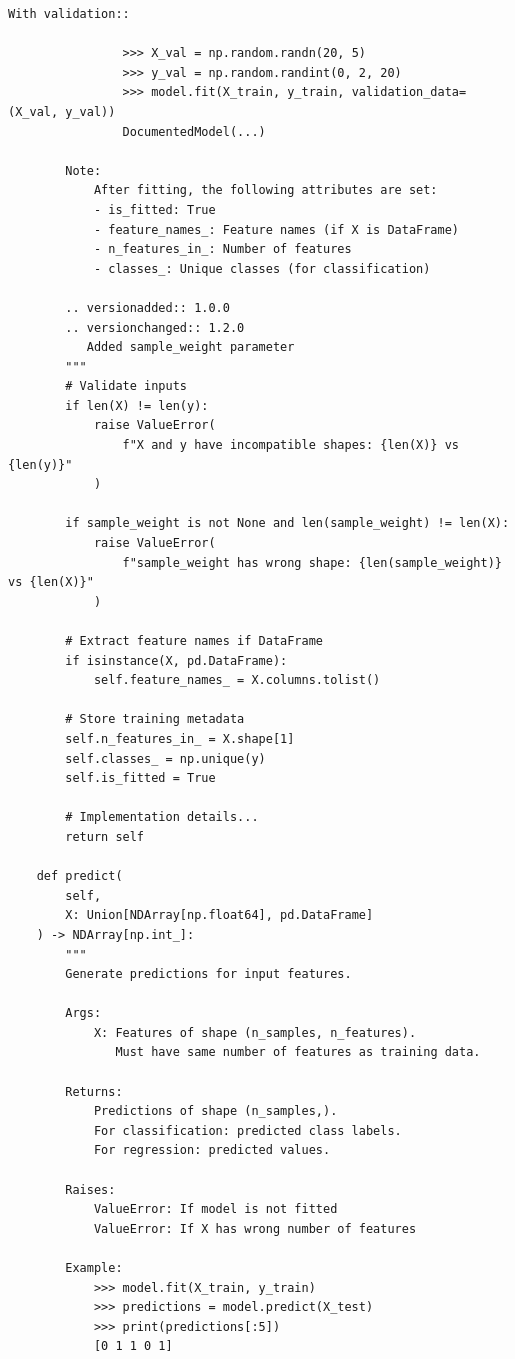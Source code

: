 \begin{lstlisting}[style=python, caption=Comprehensive docstring examples]
            With validation::

                >>> X_val = np.random.randn(20, 5)
                >>> y_val = np.random.randint(0, 2, 20)
                >>> model.fit(X_train, y_train, validation_data=(X_val, y_val))
                DocumentedModel(...)

        Note:
            After fitting, the following attributes are set:
            - is_fitted: True
            - feature_names_: Feature names (if X is DataFrame)
            - n_features_in_: Number of features
            - classes_: Unique classes (for classification)

        .. versionadded:: 1.0.0
        .. versionchanged:: 1.2.0
           Added sample_weight parameter
        """
        # Validate inputs
        if len(X) != len(y):
            raise ValueError(
                f"X and y have incompatible shapes: {len(X)} vs {len(y)}"
            )

        if sample_weight is not None and len(sample_weight) != len(X):
            raise ValueError(
                f"sample_weight has wrong shape: {len(sample_weight)} vs {len(X)}"
            )

        # Extract feature names if DataFrame
        if isinstance(X, pd.DataFrame):
            self.feature_names_ = X.columns.tolist()

        # Store training metadata
        self.n_features_in_ = X.shape[1]
        self.classes_ = np.unique(y)
        self.is_fitted = True

        # Implementation details...
        return self

    def predict(
        self,
        X: Union[NDArray[np.float64], pd.DataFrame]
    ) -> NDArray[np.int_]:
        """
        Generate predictions for input features.

        Args:
            X: Features of shape (n_samples, n_features).
               Must have same number of features as training data.

        Returns:
            Predictions of shape (n_samples,).
            For classification: predicted class labels.
            For regression: predicted values.

        Raises:
            ValueError: If model is not fitted
            ValueError: If X has wrong number of features

        Example:
            >>> model.fit(X_train, y_train)
            >>> predictions = model.predict(X_test)
            >>> print(predictions[:5])
            [0 1 1 0 1]


\end{lstlisting}
